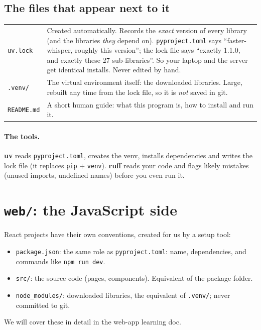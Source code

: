 \documentclass[11pt,a4paper]{article}
\begin{document}
\subsection{The files that appear next to it}
\begin{center}
\renewcommand{\arraystretch}{1.2}
\begin{tabularx}{\textwidth}{l X}
\toprule
\texttt{uv.lock} & Created automatically. Records the \emph{exact} version of every library
(and the libraries \emph{they} depend on). \texttt{pyproject.toml} says ``faster-whisper,
roughly this version''; the lock file says ``exactly 1.1.0, and exactly these 27 sub-libraries''.
So your laptop and the server get identical installs. Never edited by hand. \\
\texttt{.venv/} & The virtual environment itself: the downloaded libraries. Large, rebuilt
any time from the lock file, so it is \emph{not} saved in git. \\
\texttt{README.md} & A short human guide: what this program is, how to install and run it. \\
\bottomrule
\end{tabularx}
\end{center}

\paragraph{The tools.} \textbf{uv} reads \texttt{pyproject.toml}, creates the venv, installs
dependencies and writes the lock file (it replaces \texttt{pip} + \texttt{venv}).
\textbf{ruff} reads your code and flags likely mistakes (unused imports, undefined names)
before you even run it.

\section{\texttt{web/}: the JavaScript side}
React projects have their own conventions, created for us by a setup tool:
\begin{itemize}[nosep]
  \item \texttt{package.json}: the same role as \texttt{pyproject.toml}: name, dependencies,
        and commands like \texttt{npm run dev}.
  \item \texttt{src/}: the source code (pages, components). Equivalent of the package folder.
  \item \texttt{node\_modules/}: downloaded libraries, the equivalent of \texttt{.venv/};
        never committed to git.
\end{itemize}
We will cover these in detail in the web-app learning doc.
\end{document}
